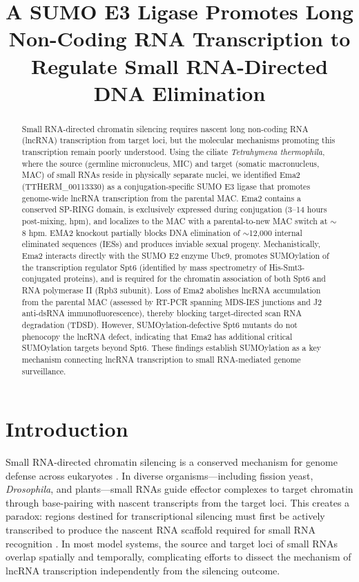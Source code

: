 \documentclass[11pt]{article}
\title{A SUMO E3 Ligase Promotes Long Non-Coding RNA Transcription to Regulate Small RNA-Directed DNA Elimination}
\author{}
\date{}
\begin{document}
\maketitle

\begin{abstract}
Small RNA-directed chromatin silencing requires nascent long non-coding RNA (lncRNA) transcription from target loci, but the molecular mechanisms promoting this transcription remain poorly understood. Using the ciliate \textit{Tetrahymena thermophila}, where the source (germline micronucleus, MIC) and target (somatic macronucleus, MAC) of small RNAs reside in physically separate nuclei, we identified Ema2 (TTHERM\_00113330) as a conjugation-specific SUMO E3 ligase that promotes genome-wide lncRNA transcription from the parental MAC. Ema2 contains a conserved SP-RING domain, is exclusively expressed during conjugation (3--14 hours post-mixing, hpm), and localizes to the MAC with a parental-to-new MAC switch at $\sim$8 hpm. EMA2 knockout partially blocks DNA elimination of $\sim$12,000 internal eliminated sequences (IESs) and produces inviable sexual progeny. Mechanistically, Ema2 interacts directly with the SUMO E2 enzyme Ubc9, promotes SUMOylation of the transcription regulator Spt6 (identified by mass spectrometry of His-Smt3-conjugated proteins), and is required for the chromatin association of both Spt6 and RNA polymerase II (Rpb3 subunit). Loss of Ema2 abolishes lncRNA accumulation from the parental MAC (assessed by RT-PCR spanning MDS-IES junctions and J2 anti-dsRNA immunofluorescence), thereby blocking target-directed scan RNA degradation (TDSD). However, SUMOylation-defective Spt6 mutants do not phenocopy the lncRNA defect, indicating that Ema2 has additional critical SUMOylation targets beyond Spt6. These findings establish SUMOylation as a key mechanism connecting lncRNA transcription to small RNA-mediated genome surveillance.
\end{abstract}

\section{Introduction}

Small RNA-directed chromatin silencing is a conserved mechanism for genome defense across eukaryotes \citep{malone2009small, czech2018pirna, holoch2015rnai}. In diverse organisms---including fission yeast, \textit{Drosophila}, and plants---small RNAs guide effector complexes to target chromatin through base-pairing with nascent transcripts from the target loci. This creates a paradox: regions destined for transcriptional silencing must first be actively transcribed to produce the nascent RNA scaffold required for small RNA recognition \citep{holoch2015rnai}. In most model systems, the source and target loci of small RNAs overlap spatially and temporally, complicating efforts to dissect the mechanism of lncRNA transcription independently from the silencing outcome.
\end{document}

